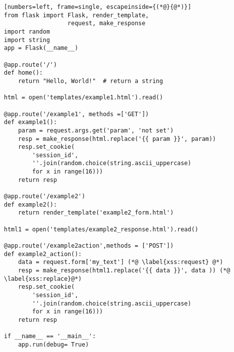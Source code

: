 \begin{lstlisting}[numbers=left, frame=single, escapeinside={(*@}{@*)}]
from flask import Flask, render_template,
                  request, make_response
import random
import string
app = Flask(__name__)

@app.route('/')
def home():
    return "Hello, World!"  # return a string

html = open('templates/example1.html').read()

@app.route('/example1', methods =['GET'])
def example1():
    param = request.args.get('param', 'not set')
    resp = make_response(html.replace('{{ param }}', param))
    resp.set_cookie(
        'session_id',
        ''.join(random.choice(string.ascii_uppercase)
        for x in range(16)))
    return resp

@app.route('/example2')
def example2():
    return render_template('example2_form.html')

html1 = open('templates/example2_response.html').read()

@app.route('/example2action',methods = ['POST'])
def example2_action():
    data = request.form['my_text'] (*@ \label{xss:request} @*)
    resp = make_response(html1.replace('{{ data }}', data )) (*@ \label{xss:replace}@*)
    resp.set_cookie(
        'session_id',
        ''.join(random.choice(string.ascii_uppercase)
        for x in range(16)))
    return resp

if __name__ == '__main__':
    app.run(debug= True)
\end{lstlisting}
